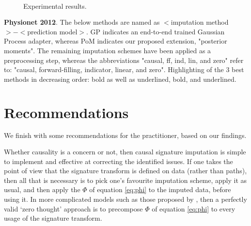 \documentclass{article}
\begin{document}
\begin{figure}[tbp]
{  }\\ %
  \caption{%
    Experimental results.
  }
  \label{fig: barplots}
\end{figure}

{\tiny
\begin{table}[h]
    \caption{\textbf{Physionet 2012}. The below methods are named as $<$imputation method$>-<$prediction model$>$. GP indicates an end-to-end trained Gaussian Process adapter, whereas PoM indicates our proposed extension, "posterior moments". The remaining imputation schemes have been applied as a preprocessing step, whereas the abbreviations "causal, ff, ind, lin, and zero" refer to: "causal, forward-filling, indicator, linear, and zero". Highlighting of the 3 best methods in decreasing order: bold as well as underlined, bold, and underlined.}
\end{table}
}


\section{Recommendations}
We finish with some recommendations for the practitioner, based on our findings.

Whether causality is a concern or not, then causal signature imputation is simple to implement and effective at correcting the identified issues. If one takes the point of view that the signature transform is defined on data (rather than paths), then all that is necessary is to pick one's favourite imputation scheme, apply it as usual, and then apply the $\Phi$ of equation \eqref{eq:phi} to the imputed data, before using it. In more complicated models such as those proposed by \cite{kidger2019deep}, then a perfectly valid `zero thought' approach is to precompose $\Phi$ of equation \eqref{eq:phi} to every usage of the signature transform.
\end{document}
